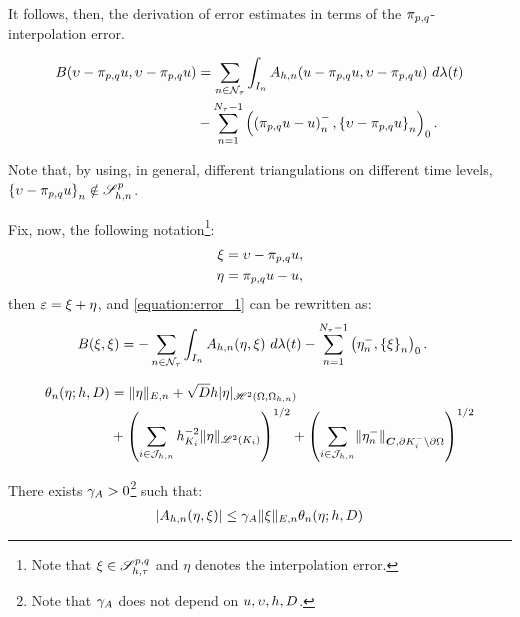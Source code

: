 It follows, then, the derivation of error estimates in terms of the $\pi_{p, q}$-interpolation error.

\begin{lemma}
    \begin{align}
        B(\upsilon - \pi_{p, q} u, \upsilon - \pi_{p, q} u) &= \sum_{n \in \mathcal{N}_{\tau}} \int_{I_n} A_{h, n}(u - \pi_{p, q} u, \upsilon - \pi_{p, q} u) ~ d \lambda(t) \label{equation:error_1} \\
        &- \sum_{n = 1}^{N_{\tau} - 1} \left( \left( \pi_{p, q} u - u \right)_n^-, \left\{ \upsilon - \pi_{p, q} u \right\}_n \right)_0. \notag
    \end{align}
\end{lemma}

Note that, by using, in general, different triangulations on different time levels, $\left\{ \upsilon - \pi_{p, q} u \right\}_n \notin \mathscr{S}^p_{h, n}$.

Fix, now, the following notation\footnote{Note that $\xi \in \mathscr{S}^{p, q}_{h, \tau}$ and $\eta$ denotes the interpolation error.}:
\begin{align}
    \xi &= \upsilon - \pi_{p, q} u, \\
    \eta &= \pi_{p, q} u - u,
\end{align}
then $\varepsilon = \xi + \eta$, and \cref{equation:error_1} can be rewritten as:
\begin{align}
    B(\xi, \xi) &= - \sum_{n \in \mathcal{N}_{\tau}} \int_{I_n} A_{h, n}(\eta, \xi) ~ d \lambda(t) - \sum_{n = 1}^{N_{\tau} - 1} \left( \eta_n^-, \left\{ \xi \right\}_n \right)_0. \label{equation:error_2}
\end{align}

\begin{definition}
    \begin{align} %
        \theta_n(\eta; h, \Diffusion) &= \lVert \eta \rVert_{E, n} + \sqrt{\Diffusion} h \lvert \eta \rvert_{\SpaceHk{2}(\Omega, \Omega_{h, n})} \\
        &+ \left( \sum_{i \in \SpaceTimeIndices} h_{K_i}^{-2} \lVert \eta \rVert_{\SpaceLp{2}(K_i)} \right)^{1/2} + \left( \sum_{i \in \SpaceTimeIndices} \lVert \eta_n^- \rVert_{\Convection, \partial K_i^- \setminus \partial \Omega} \right)^{1/2}
    \end{align}
\end{definition}

\begin{lemma}
    There exists $\gamma_{A} > 0$\footnote{Note that $\gamma_{A}$ does not depend on $u, \upsilon, h, D$.} such that:
    \begin{gather}
        \lvert A_{h, n}(\eta, \xi) \rvert \leq \gamma_{A} \lVert \xi \rVert_{E, n} \theta_n(\eta; h, D)
    \end{gather}
\end{lemma}

